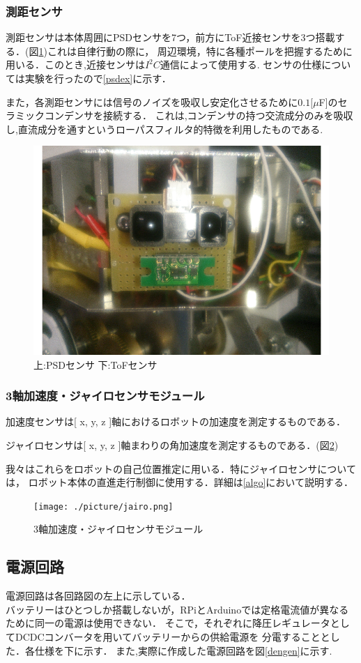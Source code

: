 \documentclass[10pt,a4j]{ujarticle}
\begin{document}
\subsubsection{測距センサ}  
測距センサは本体周囲にPSDセンサを7つ，前方にToF近接センサを3つ搭載する．(図\ref{Distance})これは自律行動の際に，
周辺環境，特に各種ポールを把握するために用いる．このとき,近接センサは$I^2 C$通信によって使用する.
センサの仕様については実験を行ったので\ref{psdex}に示す．

また，各測距センサには信号のノイズを吸収し安定化させるために$0.1[\mu $F]のセラミックコンデンサを接続する．
これは,コンデンサの持つ交流成分のみを吸収し,直流成分を通すというローパスフィルタ的特徴を利用したものである.

\begin{figure}[b]
 \centering
 \includegraphics[width=0.5\hsize]{./picture/Distance.png}
    \caption{上:PSDセンサ 下:ToFセンサ}
    \label{Distance}
\end{figure}
\subsubsection{3軸加速度・ジャイロセンサモジュール}
加速度センサは[ x, y, z ]軸におけるロボットの加速度を測定するものである．

ジャイロセンサは[ x, y, z ]軸まわりの角加速度を測定するものである．(図\ref{jairo})

我々はこれらをロボットの自己位置推定に用いる．特にジャイロセンサについては，
ロボット本体の直進走行制御に使用する．詳細は\ref{algo}において説明する．
\begin{figure}[t]
 \centering
 \texttt{[image: ./picture/jairo.png]}
    \caption{3軸加速度・ジャイロセンサモジュール}
    \label{jairo}
\end{figure}
\subsection{電源回路}
電源回路は各回路図の左上に示している．\\
バッテリーはひとつしか搭載しないが，RPiとArduinoでは定格電流値が異なるために同一の電源は使用できない．
そこで，それぞれに降圧レギュレータとしてDCDCコンバータを用いてバッテリーからの供給電源を
分電することとした．各仕様を下に示す．
また,実際に作成した電源回路を図\ref{dengen}に示す.
\end{document}
